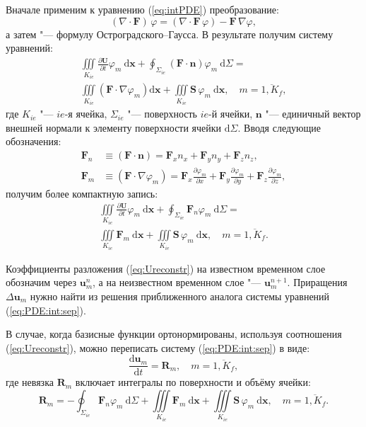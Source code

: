 Вначале применим к уравнению (\ref{eq:intPDE}) преобразование:
\[
(\nabla\cdot \mathbf F)\, \varphi = \left(\nabla\cdot \mathbf F\,\varphi\right) - \mathbf F\,\nabla\varphi,
\]
а затем "--- формулу Остроградского--Гаусса. В результате получим систему уравнений:
\begin{multline*}
\iiint\limits_{K_{ie}} \frac{\partial \mathbf U}{\partial t} \varphi_m\: \mathrm d\mathbf x + \oint_{\Sigma_{ie}} \left(\mathbf F\cdot \mathbf n\right) \varphi_m\: \mathrm d\Sigma = \\
\iiint\limits_{K_{ie}} \left(\mathbf F\cdot \nabla\varphi_m\right) \mathrm d\mathbf x + \iiint\limits_{K_{ie}} \mathbf S\, \varphi_m\: \mathrm d\mathbf x,\quad m = \overline{1, K_f},
\end{multline*}
где \(K_{ie}\) "--- \(ie\)-я ячейка, \(\Sigma_{ie}\) "--- поверхность \(ie\)-й ячейки, \(\mathbf n\) "--- единичный вектор внешней нормали к элементу поверхности ячейки \(\mathrm d\Sigma\). Вводя следующие обозначения:
\[\begin{aligned}
\mathbf F_n &\equiv \left(\mathbf F\cdot \mathbf n\right) = \mathbf F_x n_x + \mathbf F_y n_y + \mathbf F_z n_z, \\
\mathbf F_m &\equiv \left(\mathbf F\cdot \nabla\varphi_m\right) = \mathbf F_x \frac{\partial \varphi_m}{\partial x} + \mathbf F_y \frac{\partial \varphi_m}{\partial y} + \mathbf F_z \frac{\partial \varphi_m}{\partial z},
\end{aligned}\]
получим более компактную запись:
\begin{multline}\label{eq:PDE:int:sep}
\iiint\limits_{K_{ie}} \frac{\partial \mathbf U}{\partial t} \varphi_m\: \mathrm d\mathbf x + \oint_{\Sigma_{ie}} \mathbf F_n \varphi_m\: \mathrm d\Sigma =\\
\iiint\limits_{K_{ie}} \mathbf F_m\: \mathrm d\mathbf x + \iiint\limits_{K_{ie}} \mathbf S\, \varphi_m\: \mathrm d\mathbf x,\quad m = \overline{1, K_f}.
\end{multline}

Коэффициенты разложения (\ref{eq:Ureconstr}) на известном временном слое обозначим через \(\mathbf u_m^n\), а на неизвестном временном слое "--- \(\mathbf u_m^{n+1}\). Приращения \(\Delta\mathbf u_m\) нужно найти из решения приближенного аналога системы уравнений (\ref{eq:PDE:int:sep}).

В случае, когда базисные функции ортонормированы, используя соотношения (\ref{eq:Ureconstr}), можно переписать систему (\ref{eq:PDE:int:sep}) в виде:
\begin{equation}\label{eq:ODE:dudt}
\frac{\mathrm d\mathbf u_m}{\mathrm d t} = \mathbf R_m,\quad m = \overline{1, K_f},
\end{equation}
где невязка \(\mathbf R_m\) включает интегралы по поверхности и объёму ячейки:
\begin{equation}\label{eq:R}
\mathbf R_m = -\oint_{\Sigma_{ie}} \mathbf F_n \varphi_m\: \mathrm d\Sigma + \iiint\limits_{K_{ie}} \mathbf F_m\: \mathrm d\mathbf x + \iiint\limits_{K_{ie}} \mathbf S\, \varphi_m\: \mathrm d\mathbf x,\quad m = \overline{1, K_f}.
\end{equation}

